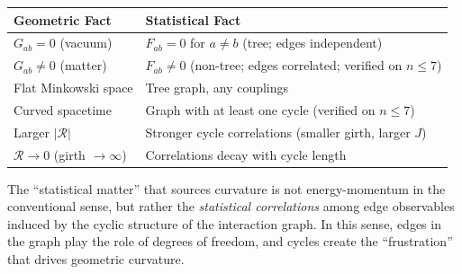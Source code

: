 \documentclass[11pt]{article}
\theoremstyle{definition}
\theoremstyle{remark}
\newcommand{\Fish}{F}
\newcommand{\Ein}{G}
\newcommand{\Scal}{\mathcal{R}}
\begin{document}
\begin{center}
\renewcommand{\arraystretch}{1.5}
\begin{tabular}{p{6cm}|p{6cm}}
\toprule
\textbf{Geometric Fact} & \textbf{Statistical Fact} \\
\midrule
$\Ein_{ab} = 0$ (vacuum) & $\Fish_{ab} = 0$ for $a \neq b$ (tree; edges independent) \\
$\Ein_{ab} \neq 0$ (matter) & $\Fish_{ab} \neq 0$ (non-tree; edges correlated; verified on $n \leq 7$) \\
Flat Minkowski space & Tree graph, any couplings \\
Curved spacetime & Graph with at least one cycle (verified on $n \leq 7$) \\
Larger $|\Scal|$ & Stronger cycle correlations (smaller girth, larger $J$) \\
$\Scal \to 0$ (girth $\to \infty$) & Correlations decay with cycle length \\
\bottomrule
\end{tabular}
\end{center}

\medskip
The ``statistical matter'' that sources curvature is not energy-momentum
in the conventional sense, but rather the \emph{statistical correlations}
among edge observables induced by the cyclic structure of the interaction
graph. In this sense, edges in the graph play the role of degrees of
freedom, and cycles create the ``frustration'' that drives geometric
curvature.
\end{document}
